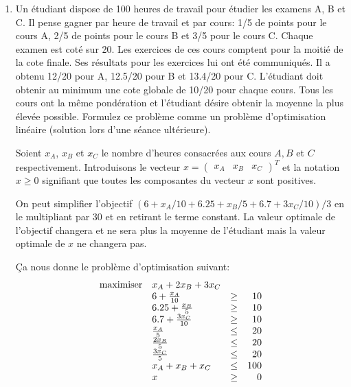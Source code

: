 \begin{enumerate}


  \item Un étudiant dispose de 100 heures de travail pour étudier les examens A, B et C. Il pense gagner par heure de travail et par
    cours: 1/5 de points pour le cours A, 2/5 de points pour le cours B et 3/5 pour le cours C. Chaque examen est coté sur 20. Les
    exercices de ces cours comptent pour la moitié de la cote finale. Ses résultats pour les exercices lui ont été communiqués. Il a
    obtenu 12/20 pour A, 12.5/20 pour B et 13.4/20 pour C.  L'étudiant doit obtenir au minimum une cote globale de 10/20 pour chaque cours. Tous
    les cours ont la même pondération et l'étudiant désire obtenir la  moyenne la plus élevée possible.  Formulez ce problème comme un problème d'optimisation
    linéaire (solution lors d'une séance ultérieure).
    \begin{solution}
      Soient $x_{A}$, $x_{B}$ et $x_{C}$ le nombre d'heures consacrées aux cours $A, B$ et $C$ respectivement.
      Introduisons le vecteur
      \(
      x =
      \begin{pmatrix}
        x_A & x_B & x_C
      \end{pmatrix}^T
      \)
      et la notation $x \geq 0$ signifiant que toutes les composantes du vecteur $x$ sont positives.

      On peut simplifier l'objectif $(6+x_A/10 + 6.25+x_B/5 + 6.7+3x_C/10)/3$
      en le multipliant par 30 et en retirant le terme constant.
      La valeur optimale de l'objectif changera et ne sera plus la moyenne de l'étudiant
      mais la valeur optimale de $x$ ne changera pas.

      Ça nous donne le problème d'optimisation suivant:
      \[
      \begin{array}{llcr}
        \mbox{maximiser} & x_A + 2x_B + 3x_C\\
        & 6 + \frac{x_A}{10} & \geq & 10\\
        & 6.25 + \frac{x_B}{5} & \geq & 10\\
        & 6.7 + \frac{3x_C}{10} & \geq & 10\\
        & \frac{x_A}{5} & \leq & 20\\
        & \frac{2x_B}{5} & \leq & 20\\
        & \frac{3x_C}{5} & \leq & 20\\
        & x_A + x_B + x_C & \leq & 100\\
        & x & \geq & 0
      \end{array}
      \]
    \end{solution}



\end{enumerate}
